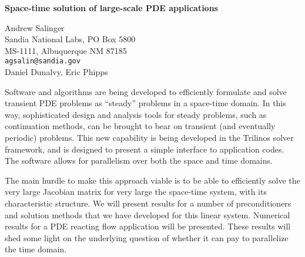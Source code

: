 \documentclass{report}
\begin{document}

\begin{center}
{\large
{\bf Space-time solution of large-scale PDE applications}}

	Andrew Salinger \\
	Sandia National Labs, PO Box 5800 \\
	MS-1111, Albuquerque NM 87185 \\
	{\tt agsalin@sandia.gov} \\
	Daniel Dunalvy, Eric Phipps
\end{center}
Software and algorithms are being developed to efficiently
formulate and solve transient PDE problems as ``steady''
problems in a space-time domain. In this way, sophisticated
design and analysis tools for steady problems, such as
continuation methods, can be brought to bear on transient
(and eventually periodic) problems. This new capability is
being developed in the Trilinos solver framework, and is
designed to present a simple interface to application codes.
The software allows for parallelism over both the space and
time domains.

The main hurdle to make this approach
viable is to be able to efficiently solve the very large
Jacobian matrix for very large the space-time system, with
its characteristic structure. We will present results for a
number of preconditioners and solution methods that we have
developed for this linear system. Numerical results for a
PDE reacting flow application will be presented. These
results will shed some light on the underlying question of
whether it can pay to parallelize the time domain.



\end{document}
